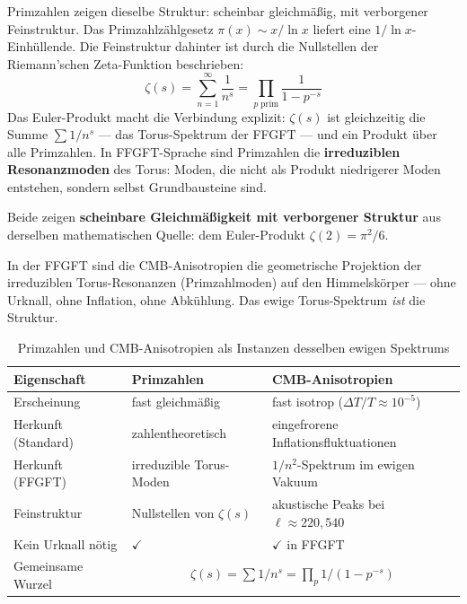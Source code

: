 Primzahlen zeigen dieselbe Struktur: scheinbar gleichmäßig, mit verborgener
Feinstruktur. Das Primzahlzählgesetz $\pi(x) \sim x/\ln x$ liefert eine
$1/\ln x$-Einhüllende. Die Feinstruktur dahinter ist durch die Nullstellen
der Riemann'schen Zeta-Funktion beschrieben:
\begin{equation}
    \zeta(s) = \sum_{n=1}^{\infty} \frac{1}{n^s}
    = \prod_{p\;\text{prim}} \frac{1}{1-p^{-s}}
\end{equation}
Das Euler-Produkt macht die Verbindung explizit: $\zeta(s)$ ist gleichzeitig
die Summe $\sum 1/n^s$ — das Torus-Spektrum der FFGFT — und ein Produkt
über alle Primzahlen. In FFGFT-Sprache sind Primzahlen die
\textbf{irreduziblen Resonanzmoden} des Torus: Moden, die nicht als
Produkt niedrigerer Moden entstehen, sondern selbst Grundbausteine sind.

\begin{interpretation}
Beide zeigen \textbf{scheinbare Gleichmäßigkeit mit verborgener Struktur}
aus derselben mathematischen Quelle: dem Euler-Produkt $\zeta(2) = \pi^2/6$.

In der FFGFT sind die CMB-Anisotropien die geometrische Projektion der
irreduziblen Torus-Resonanzen (Primzahlmoden) auf den Himmelskörper —
ohne Urknall, ohne Inflation, ohne Abkühlung. Das ewige Torus-Spektrum
\emph{ist} die Struktur.
\end{interpretation}

\begin{table}[ht]
\centering
\begin{tabular}{|p{3.8cm}|p{4.5cm}|p{4.5cm}|}
\hline
\textbf{Eigenschaft} & \textbf{Primzahlen} & \textbf{CMB-Anisotropien} \\
\hline
Erscheinung & fast gleichmäßig & fast isotrop ($\Delta T/T \approx 10^{-5}$) \\
\hline
Herkunft (Standard) & zahlentheoretisch & eingefrorene Inflationsfluktuationen \\
\hline
Herkunft (FFGFT) & irreduzible Torus-Moden & $1/n^2$-Spektrum im ewigen Vakuum \\
\hline
Feinstruktur & Nullstellen von $\zeta(s)$ & akustische Peaks bei $\ell \approx 220, 540$ \\
\hline
Kein Urknall nötig & $\checkmark$ & $\checkmark$ in FFGFT \\
\hline
Gemeinsame Wurzel & \multicolumn{2}{c|}{$\zeta(s) = \sum 1/n^s = \prod_p 1/(1-p^{-s})$} \\
\hline
\end{tabular}
\caption{Primzahlen und CMB-Anisotropien als Instanzen desselben ewigen Spektrums}
\end{table}

